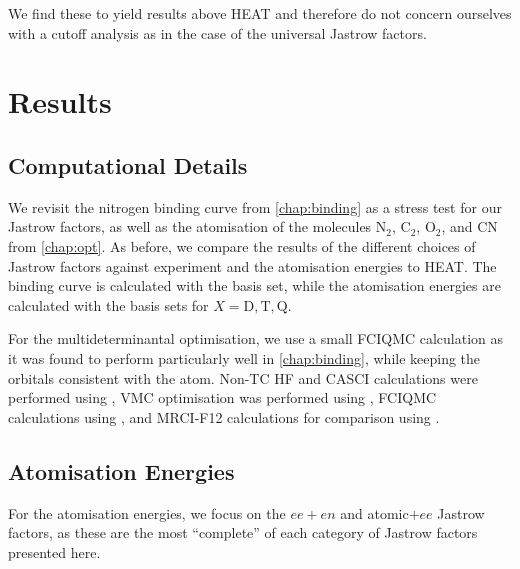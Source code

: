 We find these to yield results above HEAT and therefore do not concern ourselves with a cutoff analysis as in the case of the universal Jastrow factors.

\section{Results}

\subsection{Computational Details}

We revisit the nitrogen binding curve from \autoref{chap:binding} as a stress test for our Jastrow factors, as well as the atomisation of the molecules N$_2$, C$_2$, O$_2$, and CN from \autoref{chap:opt}. As before, we compare the results of the different choices of Jastrow factors against experiment\supercite{leroyAccurate2006} and the atomisation energies to HEAT.\supercite{fellerSurvey2008} The binding curve is calculated with the \avtz basis set, while the atomisation energies are calculated with the  basis sets for $X=\text{D},\text{T},\text{Q}$.

For the multideterminantal optimisation, we use a small FCIQMC calculation as it was found to perform particularly well in \autoref{chap:binding}, while keeping the orbitals consistent with the atom. Non-TC HF and CASCI calculations were performed using \pyscf,\supercite{sunPySCF2018} VMC optimisation was performed using \casino,\supercite{needsVariational2020} FCIQMC calculations using \neci,\supercite{gutherNECI2020} and MRCI-F12 calculations for comparison using \molpro.\supercite{wernerMOLPRO,wernerMolpro2012,wernerMolproQuantumChemistry2020}


\subsection{Atomisation Energies}

For the atomisation energies, we focus on the $ee+en$ and atomic$+ee$ Jastrow factors, as these are the most ``complete'' of each category of Jastrow factors presented here.


